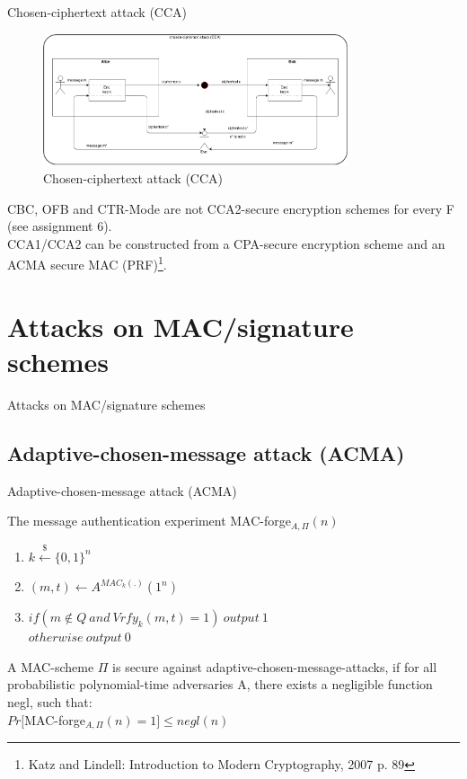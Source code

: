 \documentclass[ucs,9pt]{beamer}
\begin{document}
\begin{frame}{Chosen-ciphertext attack (CCA)}
    
    \begin{figure}[h]
        \centering
        \includegraphics[width=0.8\textwidth]{figures/CCA.png}
        \caption{Chosen-ciphertext attack (CCA)}
    \end{figure}
    CBC, OFB and CTR-Mode are not CCA2-secure encryption schemes for every F (see assignment 6).\\
    CCA1/CCA2 can be constructed from a CPA-secure encryption scheme and an ACMA secure MAC (PRF)\footnote{Katz and Lindell: Introduction to Modern Cryptography, 2007 p. 89}.\\
\end{frame}


%
%
\section{Attacks on MAC/signature schemes}

\begin{frame}
    \centering
    \huge{Attacks on MAC/signature schemes}
\end{frame}

\subsection{Adaptive-chosen-message attack (ACMA)}

\begin{frame}{Adaptive-chosen-message attack (ACMA)}
    \begin{block}{The message authentication experiment MAC-forge$_{A,\Pi}(n)$}
        \begin{enumerate}
            \item $k \overset{\$}{\leftarrow} \{0,1\}^n$
            \item $(m, t) \leftarrow A^{MAC_{k}(.)}(1^{n})$
            \item $if(m \notin Q\ and\ Vrfy_{k}(m, t) = 1)\ output\ 1$\\
            $otherwise\ output\ 0$
        \end{enumerate}
        
        A MAC-scheme $\Pi$ is secure against adaptive-chosen-message-attacks, if for all probabilistic polynomial-time adversaries A, there exists a negligible function negl, such that:\\
        $Pr[$MAC-forge$_{A,\Pi}(n) = 1] \leq negl(n)$
    \end{block}
\end{frame}
\end{document}
